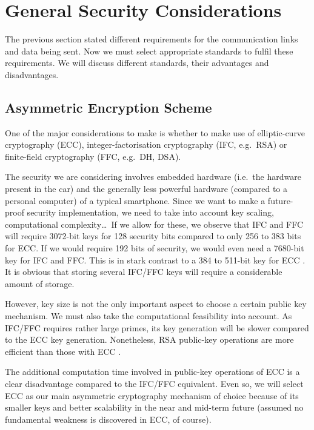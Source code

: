 \section{General Security Considerations}

The previous section stated different requirements for the communication links and data being sent. Now we must select appropriate standards to fulfil these requirements. We will discuss different standards, their advantages and disadvantages.

\subsection{Asymmetric Encryption Scheme}

One of the major considerations to make is whether to make use of elliptic-curve cryptography (ECC), integer-factorisation cryptography (IFC, e.g.\ RSA) or finite-field cryptography (FFC, e.g.\ DH, DSA).

The security we are considering involves embedded hardware (i.e.\ the hardware present in the car) and the generally less powerful hardware (compared to a personal computer) of a typical smartphone. Since we want to make a future-proof security implementation, we need to take into account key scaling, computational complexity\ldots\ If we allow for these, we observe that IFC and FFC will require 3072-bit keys for 128 security bits compared to only 256 to 383 bits for ECC. If we would require 192 bits of security, we would even need a 7680-bit key for IFC and FFC. This is in stark contrast to a 384 to 511-bit key for ECC \cite[p.\ 53]{NIST-key-management}. It is obvious that storing several IFC/FFC keys will require a considerable amount of storage.

However, key size is not the only important aspect to choose a certain public key mechanism. We must also take the computational feasibility into account. As IFC/FFC requires rather large primes, its key generation will be slower compared to the ECC key generation. Nonetheless, RSA public-key operations are more efficient than those with ECC \cite{Atmel-ECC-vs-RSA}.

The additional computation time involved in public-key operations of ECC is a clear disadvantage compared to the IFC/FFC equivalent. Even so, we will select ECC as our main asymmetric cryptography mechanism of choice because of its smaller keys and better scalability in the near and mid-term future (assumed no fundamental weakness is discovered in ECC, of course).

